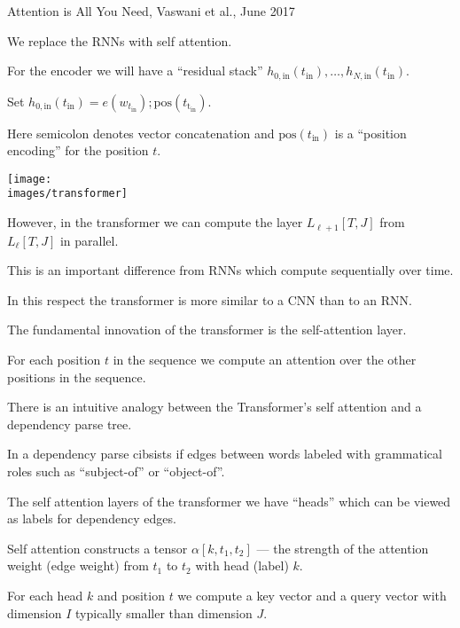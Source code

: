 {

Attention is All You Need, Vaswani et al., June 2017

\vfill
We replace the RNNs with self attention.

\vfill
For the encoder we will have a ``residual stack'' $h_{0,\mathrm{in}}(t_\mathrm{in}),\ldots,h_{N,\mathrm{in}}(t_\mathrm{in})$.

\vfill
Set $h_{0,\mathrm{in}}(t_\mathrm{in}) = e(w_{t_\mathrm{in}});\mathrm{pos}(t_\mathrm{t_\mathrm{in}})$.

\vfill
Here semicolon denotes vector concatenation and $\mathrm{pos}(t_\mathrm{in})$ is a ``position encoding'' for the position $t$.

\centerline{\texttt{[image: \\images/transformer]}}



However, in the transformer we can compute the layer $L_{\ell+1}[T,J]$ from $L_\ell[T,J]$ in parallel.

\vfill
This is an important difference from RNNs which compute sequentially over time.

\vfill
In this respect the transformer is more similar to a CNN than to an RNN.


The fundamental innovation of the transformer is the self-attention layer.

\vfill
For each position $t$ in the sequence we compute an attention over the other positions in the sequence.


There is an intuitive analogy between the Transformer's self attention and a dependency parse tree.

\vfill
In a dependency parse cibsists if edges between words labeled with grammatical roles such as ``subject-of'' or ``object-of''.

\vfill
The self attention layers of the transformer we have ``heads'' which can be viewed as labels for dependency edges.

\vfill
Self attention constructs a tensor $\alpha[k,t_1,t_2]$ --- the strength of the attention weight (edge weight)
from $t_1$ to $t_2$ with head (label) $k$.


For each head $k$ and position $t$ we compute a key vector and a query vector with dimension $I$ typically smaller than dimension $J$.

}
